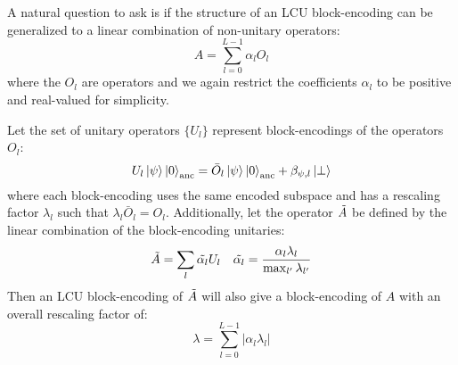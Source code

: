 A natural question to ask is if the structure of an LCU block-encoding can be generalized to a linear combination of non-unitary operators:
\begin{equation}
    \label{eq:lco}
    A = \sum_{l=0}^{L-1} \alpha_l O_l
\end{equation}
where the $O_l$ are operators and we again restrict the coefficients $\alpha_l$ to be positive and real-valued for simplicity.

Let the set of unitary operators $\{U_l\}$ represent block-encodings of the operators $O_l$:
\begin{equation}
    \label{eq:applying-operator}
    U_l \ket{\psi}\ket{0}_\text{anc} = \bar{O}_l \ket{\psi} \ket{0}_\text{anc} + \beta_{\psi, l} \ket{\perp}
\end{equation}
where each block-encoding uses the same encoded subspace and has a rescaling factor $\lambda_l$ such that $\lambda_l \bar{O}_l = O_l$.
Additionally, let the operator $\Tilde{A}$ be defined by the linear combination of the block-encoding unitaries:
\begin{equation}
    \Tilde{A} = \sum_{l} \Tilde{\alpha_l} U_l \hspace{1em} \Tilde{\alpha_l} = \frac{\alpha_l \lambda_l}{\max_{l^\prime}{\lambda_{l^\prime}}}
\end{equation} 
Then an LCU block-encoding of $\Tilde{A}$ will also give a block-encoding of $A$ with an overall rescaling factor of:
\begin{equation}
    \lambda = \sum_{l=0}^{L-1} |\alpha_l \lambda_l|
\end{equation}

